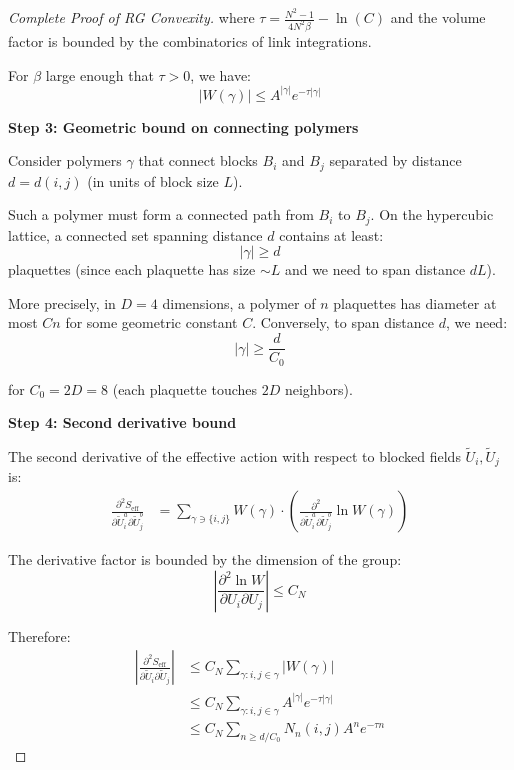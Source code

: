 \begin{proof}[Complete Proof of RG Convexity]
where $\tau = \frac{N^2-1}{4N^2\beta} - \ln(C)$ and the volume factor is bounded by the combinatorics of link integrations.

For $\beta$ large enough that $\tau > 0$, we have:
\begin{equation}
|W(\gamma)| \le A^{|\gamma|} e^{-\tau |\gamma|}
\end{equation}

\textbf{Step 3: Geometric bound on connecting polymers}

Consider polymers $\gamma$ that connect blocks $B_i$ and $B_j$ separated by distance $d = d(i,j)$ (in units of block size $L$).

Such a polymer must form a connected path from $B_i$ to $B_j$. On the hypercubic lattice, a connected set spanning distance $d$ contains at least:
\begin{equation}
|\gamma| \ge d
\end{equation}
plaquettes (since each plaquette has size $\sim L$ and we need to span distance $dL$).

More precisely, in $D=4$ dimensions, a polymer of $n$ plaquettes has diameter at most $Cn$ for some geometric constant $C$. Conversely, to span distance $d$, we need:
\begin{equation}
|\gamma| \ge \frac{d}{C_0}
\end{equation}

for $C_0 = 2D = 8$ (each plaquette touches $2D$ neighbors).

\textbf{Step 4: Second derivative bound}

The second derivative of the effective action with respect to blocked fields $\widetilde{U}_i, \widetilde{U}_j$ is:
\begin{align}
\frac{\partial^2 S_{\text{eff}}}{\partial \widetilde{U}_i^a \partial \widetilde{U}_j^b} &= \sum_{\gamma \ni \{i,j\}} W(\gamma) \cdot \left( \frac{\partial^2}{\partial \widetilde{U}_i^a \partial \widetilde{U}_j^b} \ln W(\gamma) \right)
\end{align}

The derivative factor is bounded by the dimension of the group:
\begin{equation}
\left| \frac{\partial^2 \ln W}{\partial U_i \partial U_j} \right| \le C_N
\end{equation}

Therefore:
\begin{align}
\left| \frac{\partial^2 S_{\text{eff}}}{\partial \widetilde{U}_i \partial \widetilde{U}_j} \right| &\le C_N \sum_{\gamma: i,j \in \gamma} |W(\gamma)| \\
&\le C_N \sum_{\gamma: i,j \in \gamma} A^{|\gamma|} e^{-\tau |\gamma|} \\
&\le C_N \sum_{n \ge d/C_0} N_n(i,j) A^n e^{-\tau n}
\end{align}


\end{proof}
